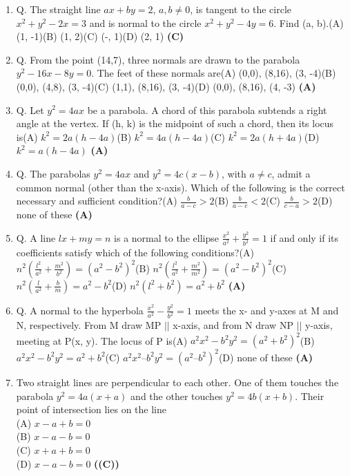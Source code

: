 \documentclass{article}
\begin{document}
\begin{enumerate}
\item Q. The straight line $ax + by = 2$, $a, b \neq 0$, is tangent to the circle $x^2 + y^2 - 2x = 3$ and is normal to the circle $x^2 + y^2 - 4y = 6$. Find (a, b).\n(A) (1, -1)\n(B) (1, 2)\n(C) (-, 1)\n(D) (2, 1) \hfill \textbf{(C)}
\item Q. From the point (14,7), three normals are drawn to the parabola $y^2 - 16x - 8y = 0$. The feet of these normals are\n(A) (0,0), (8,16), (3, -4)\n(B) (0,0), (4,8), (3, -4)\n(C) (1,1), (8,16), (3, -4)\n(D) (0,0), (8,16), (4, -3) \hfill \textbf{(A)}
\item Q. Let $y^2 = 4ax$ be a parabola. A chord of this parabola subtends a right angle at the vertex. If (h, k) is the midpoint of such a chord, then its locus is\n(A) $k^2 = 2a (h - 4a)$\n(B) $k^2 = 4a (h - 4a)$\n(C) $k^2 = 2a (h + 4a)$\n(D) $k^2 = a (h - 4a)$ \hfill \textbf{(A)}
\item Q. The parabolas $y^2 = 4ax$ and $y^2 = 4c (x - b)$, with $a \neq c$, admit a common normal (other than the x-axis). Which of the following is the correct necessary and sufficient condition?\n(A) $\frac{b}{a-c} > 2$\n(B) $\frac{b}{a-c} < 2$\n(C) $\frac{b}{c-a} > 2$\n(D) none of these \hfill \textbf{(A)}
\item Q. A line $lx + my = n$ is a normal to the ellipse $\frac{x^2}{a^2} + \frac{y^2}{b^2} = 1$ if and only if its coefficients satisfy which of the following conditions?\n(A) $n^2(\frac{l^2}{a^2} + \frac{m^2}{b^2}) = (a^2-b^2)^2$\n(B) $n^2(\frac{l^2}{a^2} + \frac{m^2}{m^2}) = (a^2-b^2)^2$\n(C) $n^2(\frac{l}{a^2} + \frac{b}{m}) = a^2-b^2$\n(D) $n^2(l^2 + b^2) = a^2 + b^2$ \hfill \textbf{(A)}
\item Q. A normal to the hyperbola $\frac{x^2}{a^2} - \frac{y^2}{b^2} = 1$ meets the x- and y-axes at M and N, respectively. From M draw MP $||$ x-axis, and from N draw NP $||$ y-axis, meeting at P(x, y). The locus of P is\n(A) $a^2x^2 - b^2y^2 = (a^2 + b^2)^2$\n(B) $a^2x^2 - b^2y^2 = a^2 + b^2$\n(C) $a^2x^2 – b^2y^2 = (a^2 – b^2)^2$\n(D) none of these \hfill \textbf{(A)}
\item Two straight lines are perpendicular to each other. One of them touches the parabola $y^2 = 4a(x + a)$ and the other touches $y^2 = 4b(x + b)$. Their point of intersection lies on the line\\
(A) $x - a + b = 0$\\
(B) $x - a - b = 0$\\
(C) $x + a + b = 0$\\
(D) $x - a - b = 0$ \hfill \textbf{((C))}

\end{enumerate}
\end{document}
